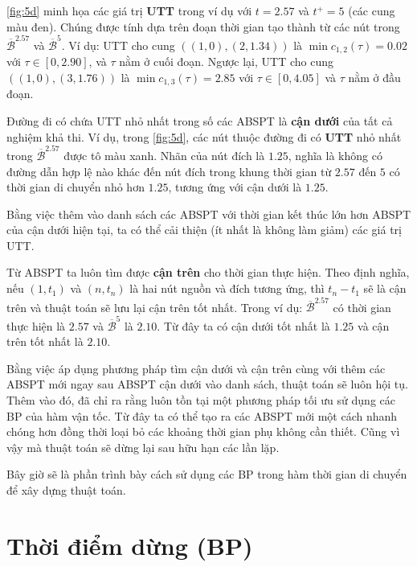 \documentclass[../main.tex]{subfiles}
\begin{document}
\autoref{fig:5d}
minh họa các giá trị \textbf{UTT} trong ví dụ với \(t = 2.57\) và
\(t^+  = 5\) (các cung màu đen). Chúng được tính dựa trên đoạn thời gian
tạo thành từ các nút trong \(\overline{\mathcal B}^{2.57}\) và
\(\overline{\mathcal B}^{5}\). Ví dụ: UTT cho cung \(((1, 0),(2, 1.34))\) là
\(\min c_{1, 2}(\tau) = 0.02\) với \(\tau \in [0, 2.90]\), và \(\tau\)
nằm ở cuối đoạn. Ngược lại, UTT cho cung \(((1, 0),(3, 1.76))\) là
\(\min c_{1,3}(\tau) = 2.85\) với \(\tau \in [0, 4.05]\) và \(\tau\)
nằm ở đầu đoạn.

Đường đi có chứa UTT nhỏ nhất trong số các ABSPT là \textbf{cận dưới}
của tất cả nghiệm khả thi. Ví dụ, trong \autoref{fig:5d}, các nút thuộc
đường đi có \textbf{UTT} nhỏ nhất trong \(\overline{\mathcal B}^{2.57}\)
được tô màu xanh. Nhãn của nút đích là \(1.25\), nghĩa là không có đường
dẫn hợp lệ nào khác đến nút đích trong khung thời gian từ \(2.57\) đến \(5\)
có thời gian di chuyển nhỏ hơn \(1.25\), tương ứng với cận dưới là
\(1.25\).

Bằng việc thêm vào danh sách các ABSPT với thời gian kết thúc lớn hơn
ABSPT của cận dưới hiện tại, ta có thể cải thiện (ít nhất là không làm
giảm) các giá trị UTT.

Từ ABSPT ta luôn tìm được \textbf{cận trên} cho thời gian thực hiện.
Theo định nghĩa, nếu \((1, t_1)\) và \((n, t_n)\) là hai nút nguồn và đích
tương ứng, thì \(t_n - t_1\) sẽ là cận trên và thuật toán sẽ lưu lại cận
trên tốt nhất. Trong ví dụ: \(\overline{\mathcal B}^{2.57}\) có thời gian
thực hiện là \(2.57\) và \(\overline{\mathcal B}^{5}\) là \(2.10\). Từ đây
ta có cận dưới tốt nhất là \(1.25\) và cận trên tốt nhất là \(2.10\).

Bằng việc áp dụng phương pháp tìm cận dưới và cận trên cùng với thêm các ABSPT mới ngay sau ABSPT cận dưới vào danh sách, thuật toán sẽ luôn hội tụ. 
Thêm vào đó, \cite{foschini2011complexity} đã chỉ ra rằng luôn tồn tại một phương pháp tối ưu sử dụng
các BP của hàm vận tốc. Từ đây ta có thể
tạo ra các ABSPT mới một cách nhanh chóng hơn
đồng thời loại bỏ các khoảng thời gian phụ không cần thiết. Cũng vì vậy
mà thuật toán sẽ dừng lại sau hữu hạn các lần lặp.

Bây giờ sẽ là phần trình bày cách sử dụng các BP trong hàm thời
gian di chuyển để xây dựng thuật toán.

\section{Thời điểm dừng (BP)}\label{ux111iux1ec3m-dux1eebng}
\end{document}
